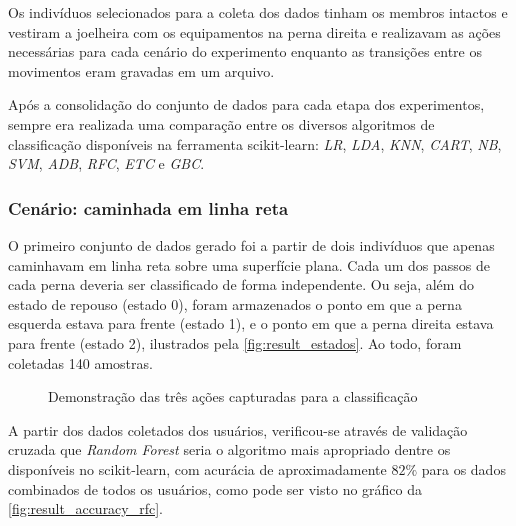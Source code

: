 Os indivíduos selecionados para a coleta dos dados tinham os membros intactos e vestiram a joelheira com os equipamentos na perna direita e realizavam as ações necessárias para cada cenário do experimento enquanto as transições entre os movimentos eram gravadas em um arquivo.

Após a consolidação do conjunto de dados para cada etapa dos experimentos, sempre era realizada uma comparação entre os diversos algoritmos de classificação disponíveis na ferramenta scikit-learn: \textit{LR}, \textit{LDA}, \textit{KNN}, \textit{CART}, \textit{NB}, \textit{SVM}, \textit{ADB}, \textit{RFC}, \textit{ETC} e \textit{GBC}.

\subsubsection{Cenário: caminhada em linha reta}

O primeiro conjunto de dados gerado foi a partir de dois indivíduos que apenas caminhavam em linha reta sobre uma superfície plana. Cada um dos passos de cada perna deveria ser classificado de forma independente. Ou seja, além do estado de repouso (estado 0), foram armazenados o ponto em que a perna esquerda estava para frente (estado 1), e o ponto em que a perna direita estava para frente (estado 2), ilustrados pela \autoref{fig:result_estados}. Ao todo, foram coletadas 140 amostras.

\begin{figure}[ht]
	\caption{\label{fig:result_estados}Demonstração das três ações capturadas para a classificação}
	\begin{center}
	\end{center}
\end{figure}

A partir dos dados coletados dos usuários, verificou-se através de validação cruzada que \textit{Random Forest} seria o algoritmo mais apropriado dentre os disponíveis no scikit-learn, com acurácia de aproximadamente \(82\%\) para os dados combinados de todos os usuários, como pode ser visto no gráfico da \autoref{fig:result_accuracy_rfc}.

